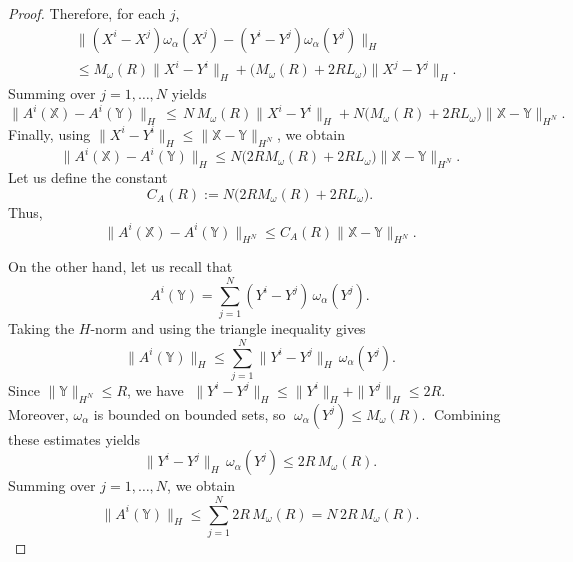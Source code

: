 \documentclass[12pt]{amsart}
\numberwithin{equation}{section}
\begin{document}
\begin{proof}
Therefore, for each $j$,
\begin{equation*}
\begin{aligned}
    &\|(X^i - X^j)\omega_\alpha(X^j) - (Y^i - Y^j)\omega_\alpha(Y^j)\|_H \\
    & \le M_\omega(R)\|X^i - Y^i\|_H + \big(M_\omega(R) + 2R L_\omega\big)\|X^j - Y^j\|_H.
\end{aligned}
\end{equation*}
Summing over $j=1,\dots,N$ yields
\begin{equation*}
    \|A^i(\mathds{X}) - A^i(\mathds{Y})\|_H \,\le\, N\, M_\omega(R)\|X^i - Y^i\|_H + N\big(M_\omega(R) + 2R L_\omega\big) \|\mathds{X} - \mathds{Y}\|_{H^N}.
\end{equation*}
Finally, using $\|X^i - Y^i\|_H \le \|\mathds{X} - \mathds{Y}\|_{H^N}$, we obtain
\begin{equation*}
    \|A^i(\mathds{X}) - A^i(\mathds{Y})\|_H \le N\big(2R M_\omega(R) + 2R L_\omega\big) \|\mathds{X} - \mathds{Y}\|_{H^N}.
\end{equation*}
Let us define the constant
\begin{equation*}
    C_A(R) := N\big(2R M_\omega(R) + 2R L_\omega\big).
\end{equation*}
Thus,
\begin{equation}\label{eq: A lip}
    \|A^i(\mathds{X}) - A^i(\mathds{Y})\|_{H^N} \le C_A(R)\|\mathds{X} - \mathds{Y}\|_{H^N}.
\end{equation}

On the other hand, let us recall that
\begin{equation*}
    A^i(\mathds{Y}) = \sum_{j=1}^N (Y^i - Y^j)\,\omega_\alpha(Y^j).
\end{equation*}
Taking the $H$-norm and using the triangle inequality gives
\begin{equation*}
    \|A^i(\mathds{Y})\|_{H} \le \sum_{j=1}^N \|Y^i - Y^j\|_{H}\,\omega_\alpha(Y^j).
\end{equation*}
Since $\|\mathds{Y}\|_{H^N} \le R$, we have $\;\|Y^i - Y^j\|_{H} \le \|Y^i\|_{H} + \|Y^j\|_{H} \le 2R.\;$
Moreover, $\omega_\alpha$ is bounded on bounded sets, so  $\;\omega_\alpha(Y^j) \le M_\omega(R).\;$ Combining these estimates yields
\begin{equation*}
    \|Y^i - Y^j\|_{H}\,\omega_\alpha(Y^j) \le 2R\,M_\omega(R).
\end{equation*}
Summing over $j=1,\dots,N$, we obtain
\begin{equation}\label{eq: A bound}
    \|A^i(\mathds{Y})\|_{H} \le \sum_{j=1}^N 2R\,M_\omega(R) = N \, 2R \, M_\omega(R).
\end{equation}


\end{proof}
\end{document}
